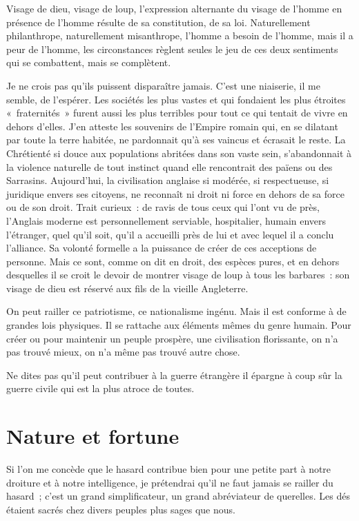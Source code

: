 \documentclass[french,twoside]{book} %
\begin{document}
\noindent Visage de dieu, visage de loup, l’expression alternante du visage de l’homme en présence de l’homme résulte de sa constitution, de sa loi. Naturellement philanthrope, naturellement misanthrope, l’homme a besoin de l’homme, mais il a peur de l’homme, les circonstances règlent seules le jeu de ces deux sentiments qui se combattent, mais se complètent.\par
Je ne crois pas qu’ils puissent disparaître jamais. C’est une niaiserie, il me semble, de l’espérer. Les sociétés les plus vastes et qui fondaient les plus étroites « fraternités » furent aussi les plus terribles pour tout ce qui tentait de vivre en dehors d’elles. J’en atteste les souvenirs de l’Empire romain qui, en se dilatant par toute la terre habitée, ne pardonnait qu’à ses vaincus et écrasait le reste. La Chrétienté si douce aux populations abritées dans son vaste sein, s’abandonnait à la violence naturelle de tout instinct quand elle rencontrait des païens ou des Sarrasins. Aujourd’hui, la civilisation anglaise si modérée, si respectueuse, si juridique envers ses citoyens, ne reconnaît ni droit ni force en dehors de sa force ou de son droit. Trait curieux : de ravis de tous ceux qui l’ont vu de près, l’Anglais moderne est personnellement serviable, hospitalier, humain envers l’étranger, quel qu’il soit, qu’il a accueilli près de lui et avec lequel il a conclu l’alliance. Sa volonté formelle a la puissance de créer de ces acceptions de personne. Mais ce sont, comme on dit en droit, des espèces pures, et en dehors desquelles il se croit le devoir de montrer visage de loup à tous les barbares : son visage de dieu est réservé aux fils de la vieille Angleterre.\par
On peut railler ce patriotisme, ce nationalisme ingénu. Mais il est conforme à de grandes lois physiques. Il se rattache aux éléments mêmes du genre humain. Pour créer ou pour maintenir un peuple prospère, une civilisation florissante, on n’a pas trouvé mieux, on n’a même pas trouvé autre chose.\par
Ne dites pas qu’il peut contribuer à la guerre étrangère il épargne à coup sûr la guerre civile qui est la plus atroce de toutes.
\section[Nature et fortune]{Nature et fortune}
\noindent Si l’on me concède que le hasard contribue bien pour une petite part à notre droiture et à notre intelligence, je prétendrai qu’il ne faut jamais se railler du hasard ; c’est un grand simplificateur, un grand abréviateur de querelles. Les dés étaient sacrés chez divers peuples plus sages que nous.\par
\end{document}
